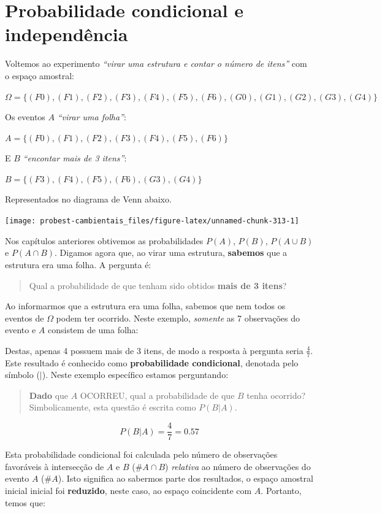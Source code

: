 \documentclass[
]{book}
\begin{document}
\hypertarget{probcondind}{%
\chapter{Probabilidade condicional e independência}\label{probcondind}}

Voltemos ao experimento \emph{``virar uma estrutura e contar o número de itens''} com o espaço amostral:

\(\Omega = \{(F0), (F1), (F2), (F3), (F4), (F5), (F6), (G0), (G1), (G2), (G3), (G4)\}\)

Os eventos \(A\) \emph{``virar uma folha''}:

\(A = \{(F0), (F1), (F2), (F3), (F4), (F5), (F6)\}\)

E \(B\) \emph{``encontar mais de 3 itens''}:

\(B = \{(F3), (F4), (F5), (F6), (G3), (G4)\}\)

Representados no diagrama de Venn abaixo.

\begin{center}\texttt{[image: probest-cambientais\_files/figure-latex/unnamed-chunk-313-1]} \end{center}

Nos capítulos anteriores obtivemos as probabilidades \(P(A)\), \(P(B)\), \(P(A \cup B)\) e \(P(A \cap B)\). Digamos agora que, ao virar uma estrutura, \textbf{sabemos} que a estrutura era uma folha. A pergunta é:

\begin{quote}
Qual a probabilidade de que tenham sido obtidos \textbf{mais de 3 itens}?
\end{quote}

Ao informarmos que a estrutura era uma folha, sabemos que nem todos os eventos de \(\Omega\) podem ter ocorrido. Neste exemplo, \emph{somente} as 7 observações do evento e \(A\) consistem de uma folha:

Destas, apenas 4 possuem mais de 3 itens, de modo a resposta à pergunta seria \(\frac{4}{7}\). Este resultado é conhecido como \textbf{probabilidade condicional}, denotada pelo símbolo (\(|\)). Neste exemplo específico estamos perguntando:

\begin{quote}
\textbf{Dado} que \(A\) OCORREU, qual a probabilidade de que \(B\) tenha ocorrido? Simbolicamente, esta questão é escrita como \(P(B|A)\).
\end{quote}

\[P(B|A) = \frac{4}{7} = 0.57\]

Esta probabilidade condicional foi calculada pelo número de observações favoráveis à intersecção de \(A\) e \(B\) (\(\#A \cap B\)) \emph{relativa} ao número de observações do evento \(A\) (\(\#A\)). Isto significa ao sabermos parte dos resultados, o espaço amostral inicial inicial foi \textbf{reduzido}, neste caso, ao espaço coincidente com \(A\). Portanto, temos que:
\end{document}
